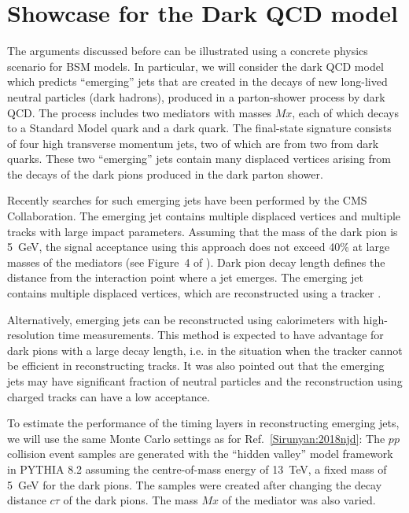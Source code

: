 \section{Showcase for the Dark QCD model}
\label{darksec}

The arguments discussed before can be illustrated using a concrete physics scenario for BSM models.
In particular, we will consider the dark QCD model \cite{Bai:2013xga,Schwaller:2015gea} which predicts 
``emerging'' jets 
that are created in the decays of new long-lived neutral 
particles (dark hadrons), produced in a parton-shower process by dark QCD.
The process includes  two mediators with masses $Mx$, each of which 
decays to a Standard Model quark and a dark quark. 
The final-state signature consists of four high transverse momentum jets, two of which 
are from two from dark quarks. These two ``emerging'' jets contain many displaced
vertices arising from the decays of the dark pions produced in the dark parton shower.


Recently searches for such emerging jets have been performed \cite{Sirunyan:2018njd} 
by the CMS Collaboration.
The emerging jet contains multiple displaced vertices and multiple 
tracks with large impact parameters. Assuming that the mass of the dark pion is 5~GeV, 
the signal acceptance using this approach does not exceed 40\% at large masses of the mediators
(see Figure~4 of \cite{Sirunyan:2018njd}).
Dark pion decay length defines the distance from the interaction point where a jet emerges. The  emerging jet contains multiple displaced vertices,
which are reconstructed using a tracker  \cite{Sirunyan:2018njd}.

Alternatively, emerging jets can be reconstructed using calorimeters with high-resolution time measurements. This method is expected
to have advantage for dark pions with a large decay length, i.e. in the situation when  the tracker cannot be efficient in reconstructing tracks.
It was also pointed out \cite{Schwaller:2015gea} that the emerging jets may have significant fraction of neutral particles and the reconstruction
using charged tracks can have a low acceptance.

To estimate the performance of the timing layers in reconstructing emerging jets,
we will use the same Monte Carlo settings as for Ref.~\ref{Sirunyan:2018njd}:
The $pp$ collision event samples  are generated with the ``hidden valley'' model framework in PYTHIA 8.2 assuming the centre-of-mass energy of 13~TeV, 
a fixed mass of 5~GeV for the dark pions. The samples were created after changing the decay distance $c\tau$ of the dark pions.  
The  mass $Mx$ of the mediator was also varied. 

